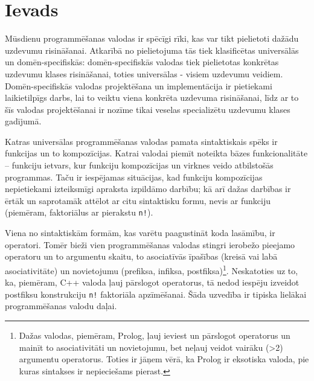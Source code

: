 \section*{Ievads}
\label{s:introduction}

Mūsdienu programmēšanas valodas ir spēcīgi rīki, kas var tikt pielietoti dažādu uzdevumu risināšanai. Atkarībā no pielietojuma tās tiek klasificētas universālās un domēn-specifiskās: domēn-specifiskās valodas tiek pielietotas konkrētas uzdevumu klases risināšanai, toties universālas - visiem uzdevumu veidiem. Domēn-specifiskās valodas projektēšana un implementācija ir pietiekami laikietilpīgs darbs, lai to veiktu viena konkrēta uzdevuma risināšanai, līdz ar to šīs valodas projektēšanai ir nozīme tikai veselas specializētu uzdevumu klases gadījumā.

Katras universālas programmēšanas valodas pamata sintaktiskais spēks ir funkcijas un to kompozīcijas. Katrai valodai piemīt noteikta bāzes funkcionalitāte  – funkciju ietvars, kur funkciju kompozīcijas un virknes veido atbilstošās programmas. Taču ir iespējamas situācijas, kad funkciju kompozīcijas nepietiekami izteiksmīgi apraksta izpildāmo darbību; kā arī dažas darbības ir ērtāk un saprotamāk attēlot ar citu sintaktisku formu, nevis ar funkciju (piemēram, faktoriālus ar pierakstu \verb|n!|).

Viena no sintaktiskām formām, kas varētu paagustināt koda lasāmību, ir operatori. Tomēr bieži vien programmēšanas valodas stingri ierobežo pieejamo operatoru un to argumentu skaitu, to asociatīvās īpašības (kreisā vai labā asociativitāte) un novietojumu (prefiksa, infiksa, postfiksa)\footnote{Dažas valodas, piemēram, Prolog, ļauj ieviest un pārslogot operatorus un mainīt to asociativitāti un novietojumu, bet neļauj veidot vairāku (>2) argumentu operatorus. Toties ir jāņem vērā, ka Prolog ir eksotiska valoda, pie kuras sintakses ir nepieciešams pierast.\cite{PrologStandard}}. Neskatoties uz to, ka, piemēram, C++ valoda ļauj pārslogot operatorus, tā nedod iespēju izveidot postfiksu konstrukciju \verb|n!| faktoriāla apzīmēšanai. Šāda uzvedība ir tipiska lielākai programmēšanas valodu  daļai. %

